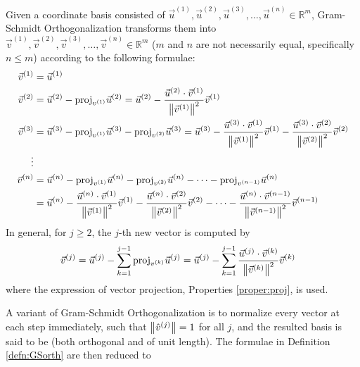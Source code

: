 \begin{defn}
\label{defn:GSorth}
Given a coordinate basis consisted of $\vec{u}^{(1)}, \vec{u}^{(2)}, \vec{u}^{(3)}, \ldots, \vec{u}^{(n)} \in \mathbb{R}^m$, Gram-Schmidt Orthogonalization transforms them into $\vec{v}^{(1)}, \vec{v}^{(2)}, \vec{v}^{(3)}, \ldots, \vec{v}^{(n)} \in \mathbb{R}^m$ ($m$ and $n$ are not necessarily equal, specifically $n \leq m$) according to the following formulae:
\begin{align*}
\vec{v}^{(1)} &= \vec{u}^{(1)} \\
\vec{v}^{(2)} &= \vec{u}^{(2)} - \text{proj}_{v^{(1)}}\vec{u}^{(2)} = \vec{u}^{(2)} - \frac{\vec{u}^{(2)} \cdot \vec{v}^{(1)}}{\norm{\vec{v}^{(1)}}^2} \vec{v}^{(1)} \\
\vec{v}^{(3)} &= \vec{u}^{(3)} - \text{proj}_{v^{(1)}}\vec{u}^{(3)} - \text{proj}_{v^{(2)}}\vec{u}^{(3)} = \vec{u}^{(3)} - \frac{\vec{u}^{(3)} \cdot \vec{v}^{(1)}}{\norm{\vec{v}^{(1)}}^2} \vec{v}^{(1)} - \frac{\vec{u}^{(3)} \cdot \vec{v}^{(2)}}{\norm{\vec{v}^{(2)}}^2} \vec{v}^{(2)} \\
\vdots \\
\vec{v}^{(n)} &= \vec{u}^{(n)} - \text{proj}_{v^{(1)}}\vec{u}^{(n)} - \text{proj}_{v^{(2)}}\vec{u}^{(n)} - \cdots - \text{proj}_{v^{(n-1)}}\vec{u}^{(n)} \\
&= \vec{u}^{(n)} - \frac{\vec{u}^{(n)} \cdot \vec{v}^{(1)}}{\norm{\vec{v}^{(1)}}^2} \vec{v}^{(1)} - \frac{\vec{u}^{(n)} \cdot \vec{v}^{(2)}}{\norm{\vec{v}^{(2)}}^2} \vec{v}^{(2)} - \cdots - \frac{\vec{u}^{(n)} \cdot \vec{v}^{(n-1)}}{\norm{\vec{v}^{(n-1)}}^2} \vec{v}^{(n-1)}
\end{align*}
In general, for $j \geq 2$, the $j$-th new vector is computed by
\begin{align*}
\vec{v}^{(j)} &= \vec{u}^{(j)} - \sum_{k=1}^{j-1}\text{proj}_{v^{(k)}}\vec{u}^{(j)}  = \vec{u}^{(j)} - \sum_{k=1}^{j-1}\frac{\vec{u}^{(j)} \cdot \vec{v}^{(k)}}{\norm{\vec{v}^{(k)}}^2} \vec{v}^{(k)}
\end{align*}
where the expression of vector projection, Properties \ref{proper:proj}, is used.
\end{defn}
A variant of Gram-Schmidt Orthogonalization is to normalize every vector at each step immediately, such that $\norm{\hat{v}^{(j)}} = 1$ for all $j$, and the resulted basis is said to be  (both orthogonal and of unit length). The formulae in Definition \ref{defn:GSorth} are then reduced to

